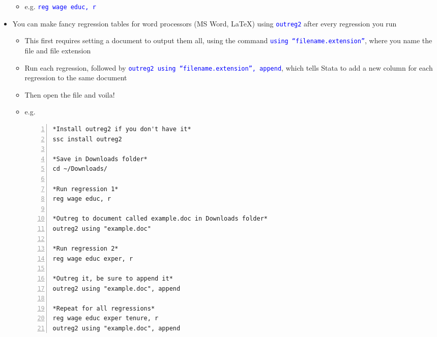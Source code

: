 \documentclass{article}
\begin{document}
\begin{itemize}
	\begin{itemize}
		\item e.g. \textcolor{blue}{\texttt{reg wage educ, r}}
	\end{itemize}
	\item You can make fancy regression tables for word processors (MS Word, LaTeX) using \textcolor{blue}{\texttt{outreg2}} after every regression you run
	\begin{itemize}
		\item This first requires setting a document to output them all, using the command \textcolor{blue}{\texttt{using ``filename.extension''}}, where you name the file and file extension
		\item Run each regression, followed by \textcolor{blue}{\texttt{outreg2 using ``filename.extension'', append}}, which tells Stata to add a new column for each regression to the same document
		\item Then open the file and voila! 
		\item e.g. 
	\begin{Verbatim}[frame=single, numbers=left, numbersep=2pt] 
*Install outreg2 if you don't have it*
ssc install outreg2

*Save in Downloads folder*
cd ~/Downloads/

*Run regression 1*
reg wage educ, r

*Outreg to document called example.doc in Downloads folder*
outreg2 using "example.doc"

*Run regression 2*
reg wage educ exper, r

*Outreg it, be sure to append it*
outreg2 using "example.doc", append

*Repeat for all regressions*
reg wage educ exper tenure, r
outreg2 using "example.doc", append
\end{Verbatim}
	\end{itemize}
\end{itemize}
\end{document}

